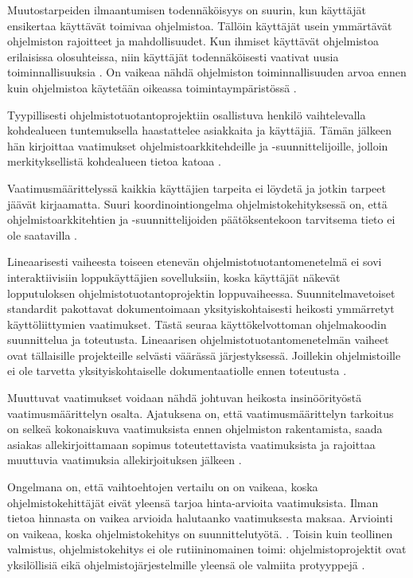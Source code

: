 \documentclass[finnish]{tktltiki2}
\theoremstyle{definition}
\theoremstyle{remark}
\begin{document}
Muutostarpeiden ilmaantumisen todennäköisyys on suurin, kun käyttäjät ensikertaa käyttävät toimivaa ohjelmistoa. Tällöin käyttäjät usein ymmärtävät ohjelmiston rajoitteet ja mahdollisuudet. Kun ihmiset käyttävät ohjelmistoa erilaisissa olosuhteissa, niin käyttäjät todennäköisesti vaativat uusia toiminnallisuuksia \cite{KES95}. On vaikeaa nähdä ohjelmiston toiminnallisuuden arvoa ennen kuin ohjelmistoa käytetään oikeassa toimintaympäristössä \cite{FOW01a}.

Tyypillisesti ohjelmistotuotantoprojektiin osallistuva henkilö vaihtelevalla kohdealueen tuntemuksella haastattelee asiakkaita ja käyttäjiä. Tämän jälkeen hän kirjoittaa vaatimukset ohjelmistoarkkitehdeille ja -suunnittelijoille, jolloin merkityksellistä kohdealueen tietoa katoaa \cite{KES95}.

Vaatimusmäärittelyssä kaikkia käyttäjien tarpeita ei löydetä ja jotkin tarpeet jäävät kirjaamatta. Suuri koordinointiongelma ohjelmistokehityksessä on, että ohjelmistoarkkitehtien ja -suunnittelijoiden päätöksentekoon tarvitsema tieto ei ole saatavilla \cite{KES95}.

Lineaarisesti vaiheesta toiseen etenevän ohjelmistotuotantomenetelmä ei sovi interaktiivisiin loppukäyttäjien sovelluksiin, koska käyttäjät näkevät lopputuloksen ohjelmistotuotantoprojektin loppuvaiheessa. Suunnitelmavetoiset standardit pakottavat dokumentoimaan yksityiskohtaisesti heikosti ymmärretyt käyttöliittymien vaatimukset. Tästä seuraa käyttökelvottoman ohjelmakoodin suunnittelua ja toteutusta. Lineaarisen ohjelmistotuotantomenetelmän vaiheet ovat tällaisille projekteille selvästi väärässä järjestyksessä. Joillekin ohjelmistoille ei ole tarvetta yksityiskohtaiselle dokumentaatiolle ennen toteutusta \cite{BOE88}.


Muuttuvat vaatimukset voidaan nähdä johtuvan heikosta insinöörityöstä vaatimusmäärittelyn osalta. Ajatuksena on, että vaatimusmäärittelyn tarkoitus on selkeä kokonaiskuva vaatimuksista ennen ohjelmiston rakentamista, saada asiakas allekirjoittamaan sopimus toteutettavista vaatimuksista ja rajoittaa muuttuvia vaatimuksia allekirjoituksen jälkeen \cite{FOW01a}.

Ongelmana on, että vaihtoehtojen vertailu on on vaikeaa, koska ohjelmistokehittäjät eivät yleensä tarjoa hinta-arvioita vaatimuksista. Ilman tietoa hinnasta on vaikea arvioida halutaanko vaatimuksesta maksaa. Arviointi on vaikeaa, koska ohjelmistokehitys on suunnittelutyötä. \cite{FOW01a}. Toisin kuin teollinen valmistus, ohjelmistokehitys ei ole rutiininomainen toimi: ohjelmistoprojektit ovat yksilöllisiä eikä ohjelmistojärjestelmille yleensä ole valmiita protyyppejä \cite{KES95}.
\end{document}
